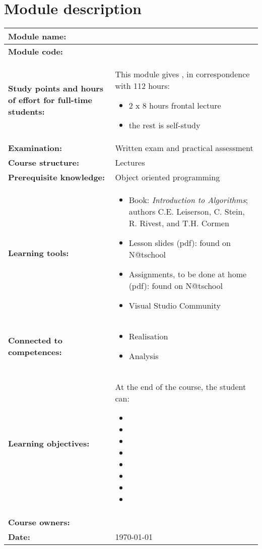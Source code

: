 \section*{Module description}
\begin{tabularx}{\textwidth}{|>{\columncolor{lichtGrijs}} p{}|X|}
	\hline
	\textbf{Module name:} & \modulenaam\\
	\hline
	\textbf{Module code: }& \modulecode\\
	\hline
	\textbf{Study points \newline and hours of effort for full-time students:} & This module gives \stdPunten, in correspondence with 112 hours:
	\begin{itemize}
		\item 2 x 8 hours frontal lecture
		\item the rest is self-study
	\end{itemize} \\
	\hline
	\textbf{Examination:} & Written exam and practical assessment \\
	\hline
	\textbf{Course structure:} & Lectures \\
	\hline
	\textbf{Prerequisite knowledge:} & Object oriented programming \\
	\hline
	\textbf{Learning tools:} & \begin{itemize}
			\item Book: \textit{Introduction to Algorithms}; authors
			C.E. Leiserson, C. Stein, R. Rivest, and T.H. Cormen
			\item Lesson slides (pdf): found on N@tschool
			\item Assignments, to be done at home (pdf): found on N@tschool
			\item Visual Studio Community
		\end{itemize} \\
	\hline
	\textbf{Connected to \newline competences:} & \begin{itemize}
			\item Realisation
			\item Analysis
		\end{itemize} \\
	\hline
	\textbf{Learning objectives:} &
		At the end of the course, the student can:
			\begin{itemize}
				\item \lga
				\item \lgb
				\item \lgc
				\item \lgd
				\item \lge 
				\item \lgf
				\item \lgg
				\item \lgh
			\end{itemize} \\
	\hline

	\textbf{Course owners:} & \author\\
	\hline
	\textbf{Date:} & \today \\
	\hline
\end{tabularx}
\newpage

